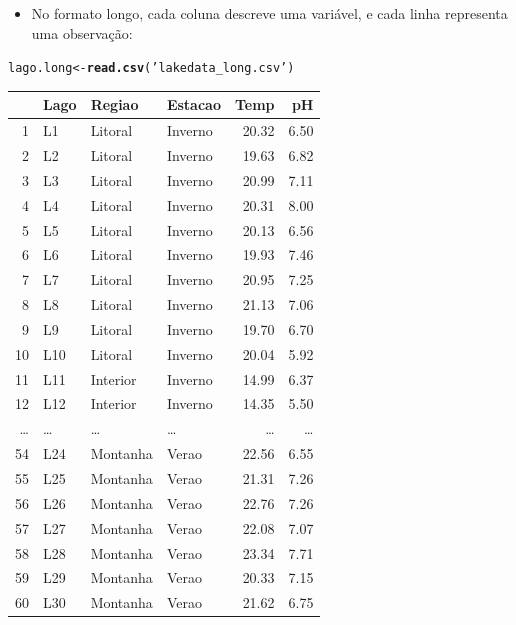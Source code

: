 \documentclass{beamer}\usepackage[]{graphicx}\usepackage[]{color}
\makeatletter
\newcommand{\hlstr}[1]{\textcolor[rgb]{0.192,0.494,0.8}{#1}}%
\newcommand{\hlstd}[1]{\textcolor[rgb]{0.345,0.345,0.345}{#1}}%
\newcommand{\hlkwb}[1]{\textcolor[rgb]{0.69,0.353,0.396}{#1}}%
\newcommand{\hlkwd}[1]{\textcolor[rgb]{0.737,0.353,0.396}{\textbf{#1}}}%
\newenvironment{kframe}{%
 \def\at@end@of@kframe{}%
 \ifinner\ifhmode%
  \def\at@end@of@kframe{\end{minipage}}%
  \begin{minipage}{\columnwidth}%
 \fi\fi%
 \def\FrameCommand##1{\hskip\@totalleftmargin \hskip-\fboxsep
 \colorbox{shadecolor}{##1}\hskip-\fboxsep
     \hskip-\linewidth \hskip-\@totalleftmargin \hskip\columnwidth}%
 \MakeFramed {\advance\hsize-\width
   \@totalleftmargin\z@ \linewidth\hsize
   \@setminipage}}%
 {\par\unskip\endMakeFramed%
 \at@end@of@kframe}
\newenvironment{knitrout}{}{} %
\renewenvironment{knitrout}{\setlength{\topsep}{0mm}}{}
\makeatother
\begin{document}
\begin{frame}[fragile]

\begin{itemize}
  \item No formato longo, cada coluna descreve uma variável, e cada linha representa uma observação:
\end{itemize} \pause

\begin{knitrout}\tiny
{}\color{fgcolor}\begin{kframe}
\begin{alltt}
\hlstd{lago.long} \hlkwb{<-} \hlkwd{read.csv}\hlstd{(}\hlstr{'lakedata_long.csv'}\hlstd{)}
\end{alltt}
\end{kframe}
\end{knitrout}

\begin{tiny}
\begin{table}[ht]
\centering
\begin{tabular}{rlllrr}
  \hline
 & Lago & Regiao & Estacao & Temp & pH \\ 
  \hline
1 & L1 & Litoral & Inverno & 20.32 & 6.50 \\ 
  2 & L2 & Litoral & Inverno & 19.63 & 6.82 \\ 
  3 & L3 & Litoral & Inverno & 20.99 & 7.11 \\ 
  4 & L4 & Litoral & Inverno & 20.31 & 8.00 \\ 
  5 & L5 & Litoral & Inverno & 20.13 & 6.56 \\ 
  6 & L6 & Litoral & Inverno & 19.93 & 7.46 \\ 
  7 & L7 & Litoral & Inverno & 20.95 & 7.25 \\ 
  8 & L8 & Litoral & Inverno & 21.13 & 7.06 \\ 
  9 & L9 & Litoral & Inverno & 19.70 & 6.70 \\ 
  10 & L10 & Litoral & Inverno & 20.04 & 5.92 \\ 
  11 & L11 & Interior & Inverno & 14.99 & 6.37 \\ 
  12 & L12 & Interior & Inverno & 14.35 & 5.50 \\ 
   \ldots & \ldots & \ldots & \ldots & \ldots & \ldots \\
   54 & L24 & Montanha & Verao & 22.56 & 6.55 \\ 
  55 & L25 & Montanha & Verao & 21.31 & 7.26 \\ 
  56 & L26 & Montanha & Verao & 22.76 & 7.26 \\ 
  57 & L27 & Montanha & Verao & 22.08 & 7.07 \\ 
  58 & L28 & Montanha & Verao & 23.34 & 7.71 \\ 
  59 & L29 & Montanha & Verao & 20.33 & 7.15 \\ 
  60 & L30 & Montanha & Verao & 21.62 & 6.75 \\ 
   \hline
\end{tabular}
\end{table}
\end{tiny}

\end{frame}
\end{document}
